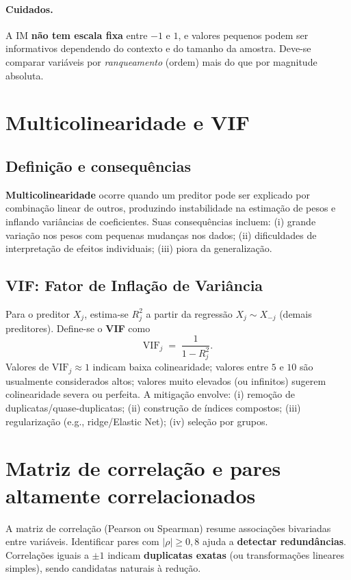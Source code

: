 \documentclass[12pt,a4paper]{article}
\begin{document}
\paragraph{Cuidados.} A IM \textbf{não tem escala fixa} entre $-1$ e $1$, e valores pequenos podem ser informativos dependendo do contexto e do tamanho da amostra. Deve-se comparar variáveis por \emph{ranqueamento} (ordem) mais do que por magnitude absoluta.

\section{Multicolinearidade e VIF}
\subsection{Definição e consequências}
\textbf{Multicolinearidade} ocorre quando um preditor pode ser explicado por combinação linear de outros, produzindo instabilidade na estimação de pesos e inflando variâncias de coeficientes. Suas consequências incluem: (i) grande variação nos pesos com pequenas mudanças nos dados; (ii) dificuldades de interpretação de efeitos individuais; (iii) piora da generalização.

\subsection{VIF: Fator de Inflação de Variância}
Para o preditor $X_j$, estima-se $R_j^2$ a partir da regressão $X_j \sim X_{-j}$ (demais preditores). Define-se o \textbf{VIF} como
\begin{equation}
\mathrm{VIF}_j \;=\; \frac{1}{1 - R_j^2}.
\end{equation}
Valores de $\mathrm{VIF}_j \approx 1$ indicam baixa colinearidade; valores entre $5$ e $10$ são usualmente considerados altos; valores muito elevados (ou infinitos) sugerem colinearidade severa ou perfeita. A mitigação envolve: (i) remoção de duplicatas/quase-duplicatas; (ii) construção de índices compostos; (iii) regularização (e.g., ridge/Elastic Net); (iv) seleção por grupos.

\section{Matriz de correlação e pares altamente correlacionados}
A matriz de correlação (Pearson ou Spearman) resume associações bivariadas entre variáveis. Identificar pares com $|\rho| \ge 0{,}8$ ajuda a \textbf{detectar redundâncias}. Correlações iguais a $\pm 1$ indicam \textbf{duplicatas exatas} (ou transformações lineares simples), sendo candidatas naturais à redução.
\end{document}
